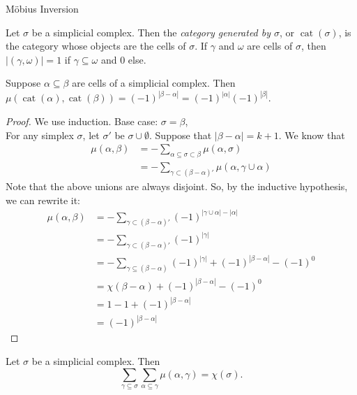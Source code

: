 \documentclass[12pt]{pom_thesis}
\DeclareMathOperator{\cat}{cat}
\begin{document}
\begin{chapter}{M\"obius Inversion}
\begin{defn}
Let $\sigma$ be a simplicial complex. Then the \emph{category generated by $\sigma$}, or $\cat(\sigma)$, is the category whose objects are the cells of $\sigma$. If $\gamma$ and $\omega$ are cells of $\sigma$, then $|(\gamma, \omega)| = 1$ if $\gamma \subseteq \omega$ and 0 else.
\end{defn}
\begin{lemma}
\label{mu_lemma}
Suppose $\alpha \subseteq \beta$ are cells of a simplicial complex. Then $\mu(\cat(\alpha), \cat(\beta)) =(-1)^{|\beta - \alpha|} = (-1)^{|\alpha|} (-1)^{|\beta|}$.
\end{lemma}
\begin{proof}
We use induction. Base case: $\sigma = \beta$, \checkmark \\
For any simplex $\sigma$, let $\sigma'$ be $\sigma \cup \emptyset$. Suppose that $|\beta - \alpha| = k+1$. We know that \begin{align*}
\mu(\alpha, \beta) &=  - \sum_{\alpha \subseteq \sigma \subset \beta} \mu(\alpha, \sigma)\\
&= - \sum_{\gamma \subset (\beta - \alpha)'} \mu(\alpha, \gamma \cup \alpha) 
\end{align*}
Note that the above unions are always disjoint. So, by the inductive hypothesis, we can rewrite it:
\begin{align*}
\mu(\alpha, \beta) &= - \sum_{\gamma \subset (\beta - \alpha)'} (-1)^{|\gamma \cup \alpha| - |\alpha|} \\ %
&= - \sum_{\gamma \subset (\beta - \alpha)'} (-1)^{|\gamma|}\\ %
&= - \sum_{\gamma \subseteq (\beta - \alpha)} (-1)^{|\gamma|} + (-1)^{|\beta - \alpha|} - (-1)^0 \\ %
&= \chi(\beta - \alpha) + (-1)^{|\beta - \alpha|} - (-1)^0\\
&= 1-1+ (-1)^{|\beta - \alpha|}\\
&= (-1)^{|\beta - \alpha|}
\end{align*}


\end{proof}
\begin{thm}
\label{consistentEuler}
Let $\sigma$ be a simplicial complex. Then 
\[
\sum_{\gamma \subseteq \sigma} \sum_{\alpha \subseteq \gamma} \mu(\alpha, \gamma) = \chi(\sigma).
\]


\end{thm}
\end{chapter}
\end{document}
